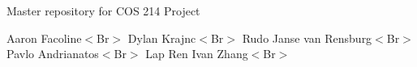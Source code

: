 Master repository for C\+OS 214 Project

Aaron Facoline$<$\+Br$>$ Dylan Krajnc$<$\+Br$>$ Rudo Janse van Rensburg$<$\+Br$>$ Pavlo Andrianatos$<$\+Br$>$ Lap Ren Ivan Zhang$<$\+Br$>$ 